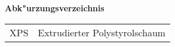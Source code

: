 \addtocounter{table}{-1} 
\bigskip
\Large \textsf{\textbf{Abk"urzungsverzeichnis}}
\begin{longtable}{p{2 cm}p{8 cm}} 
XPS & Extrudierter Polystyrolschaum\\

\end{longtable}